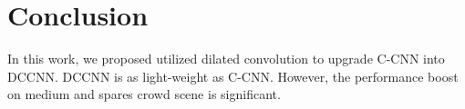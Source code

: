 \section{Conclusion}
In this work, we proposed utilized dilated convolution to upgrade C-CNN \cite{9053780} into DCCNN. DCCNN is as light-weight as C-CNN. However, the performance boost on medium and spares crowd scene is significant. 